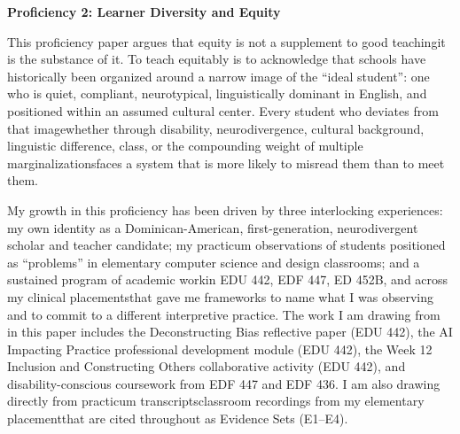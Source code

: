 \documentclass[12pt]{article}
\begin{document}
\begin{titlepage}
\begin{center}
\vspace*{0.14\textheight}
{\Large\bfseries Proficiency 2: Learner Diversity and Equity\par}
\vspace{0.06\textheight}
{\PortfolioAuthor\par}
{\PortfolioAffiliation\par}
\vspace{1.25\baselineskip}
{\PortfolioProgram\par}
\vspace{1.25\baselineskip}
{\PortfolioDate\par}
\vfill
\end{center}
\end{titlepage}

\setcounter{page}{2}


This proficiency paper argues that equity is not a supplement to good teaching\textemdash{}it is the substance of it. To teach equitably is to acknowledge that schools have historically been organized around a narrow image of the ``ideal student'': one who is quiet, compliant, neurotypical, linguistically dominant in English, and positioned within an assumed cultural center. Every student who deviates from that image\textemdash{}whether through disability, neurodivergence, cultural background, linguistic difference, class, or the compounding weight of multiple marginalizations\textemdash{}faces a system that is more likely to misread them than to meet them.

My growth in this proficiency has been driven by three interlocking experiences: my own identity as a Dominican-American, first-generation, neurodivergent scholar and teacher candidate; my practicum observations of students positioned as ``problems'' in elementary computer science and design classrooms; and a sustained program of academic work\textemdash{}in EDU 442, EDF 447, ED 452B, and across my clinical placements\textemdash{}that gave me frameworks to name what I was observing and to commit to a different interpretive practice. The work I am drawing from in this paper includes the Deconstructing Bias reflective paper (EDU 442), the AI Impacting Practice professional development module (EDU 442), the Week 12 Inclusion and Constructing Others collaborative activity (EDU 442), and disability-conscious coursework from EDF 447 and EDF 436. I am also drawing directly from practicum transcripts\textemdash{}classroom recordings from my elementary placement\textemdash{}that are cited throughout as Evidence Sets (E1--E4).
\end{document}
